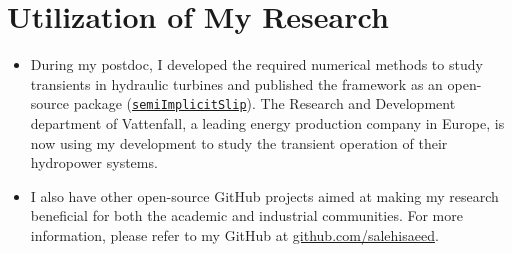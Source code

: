 \section{Utilization of My Research}{}
\begin{itemize}[]
    \item During my postdoc, I developed the required numerical methods to study transients in hydraulic turbines and published the framework as an open-source package (\href{https://github.com/salehisaeed/semiImplicitSlip}{\texttt{semiImplicitSlip}}). The Research and Development department of Vattenfall, a leading energy production company in Europe, is now using my development to study the transient operation of their hydropower systems.

    \item I also have other open-source GitHub projects aimed at making my research beneficial for both the academic and industrial communities. For more information, please refer to my GitHub at \href{https://github.com/salehisaeed}{github.com/salehisaeed}.

\end{itemize}
